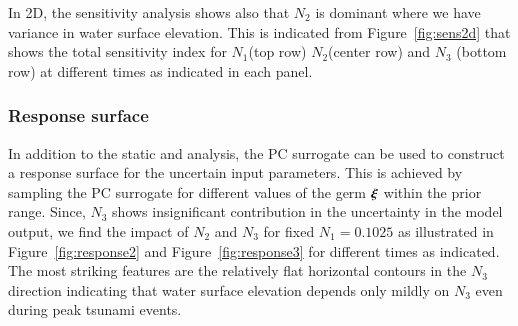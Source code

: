 In 2D, the sensitivity analysis shows also that $N_2$ is dominant
where we have variance in water surface elevation. This is
indicated from Figure~\ref{fig:sens2d} that shows the total sensitivity index
for $N_1$(top row) $N_2$(center row) and $N_3$ (bottom row)
at different times as indicated in each panel.

\subsubsection{Response surface}
In addition to the static and analysis, the PC surrogate 
can be used to construct a response surface for the uncertain input parameters.
This is achieved by sampling the PC surrogate for different values of the germ $\xxi$ within the prior
range. Since, $N_3$ shows insignificant contribution in the 
uncertainty in the model output, we find the impact of $N_2$ and $N_3$ for 
fixed $N_1=0.1025$ as illustrated in Figure~\ref{fig:response2}
and Figure~\ref{fig:response3}
for different times as indicated. The most striking features are the relatively flat
horizontal contours in the $N_3$ direction indicating that water surface elevation depends
only mildly on $N_3$ even during peak tsunami events.
